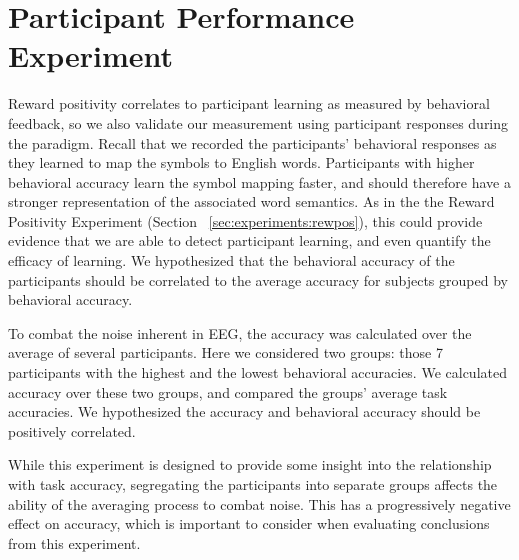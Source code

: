 \section{Participant Performance Experiment}
Reward positivity correlates to participant learning as measured by behavioral 
feedback, so we also validate our measurement using participant responses 
during the paradigm. Recall that we recorded the participants' behavioral 
responses as they learned to map the symbols to English words. Participants 
with higher behavioral accuracy learn the symbol mapping faster, and should 
therefore have a stronger representation of the associated word semantics. As 
in the the Reward Positivity Experiment (Section 
~\ref{sec:experiments:rewpos}), this could provide evidence that we are able to 
detect participant learning, and even quantify the efficacy of learning. We 
hypothesized that the behavioral accuracy of the participants should be 
correlated to the average \tvt accuracy for subjects grouped by behavioral 
accuracy.

To combat the noise inherent in EEG, the \tvt accuracy was calculated over the 
average of several participants. Here we considered two groups: those 7 
participants with the highest and the lowest behavioral accuracies. We 
calculated \tvt accuracy over these two groups, and compared the groups' 
average task accuracies. We hypothesized the \tvt accuracy and behavioral 
accuracy should be positively correlated.

While this experiment is designed to provide some insight into the relationship 
with task accuracy, segregating the participants into separate groups affects 
the ability of the averaging process to combat noise. This has a progressively 
negative effect on \tvt accuracy, which is important to consider when 
evaluating conclusions from this experiment.
